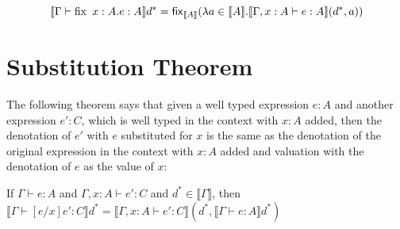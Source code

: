 \[\llbracket \Gamma \vdash \operatorname{fix} \ x : A. e : A \rrbracket d^* = \operatorname{\mathsf{fix}}_{\llbracket A \rrbracket} (\lambda a \in \llbracket A \rrbracket . \llbracket \Gamma, x : A \vdash e : A \rrbracket(d^*, a)) \] 

\section{Substitution Theorem}
The following theorem says that given a well typed expression $e : A$ and another expression $e' : C$, which is well typed in the context with $x:A$ added, then the denotation of $e'$ with $e$ substituted for $x$ is the same as the denotation of the original expression in the context with $x:A$ added and valuation with the denotation of $e$ as the value of $x$:

\vspace{0.5cm}

\begin{thm}
If $\Gamma \vdash e : A$ and $\Gamma, x:A \vdash e' : C$ and $d^* \in \llbracket \Gamma \rrbracket$, then $\llbracket \Gamma \vdash [e/x]e' : C \rrbracket d^* =\llbracket \Gamma, x : A \vdash e': C \rrbracket (d^*, \llbracket \Gamma \vdash e : A \rrbracket d^*)$
\end{thm}

